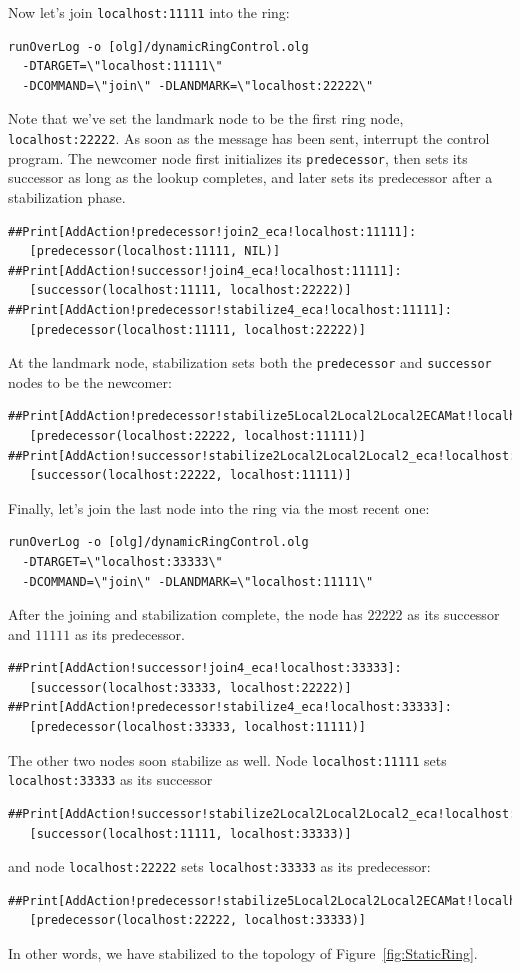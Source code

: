 \documentclass{article}
\begin{document}
Now let's join \lstinline$localhost:11111$ into the ring:
\begin{verbatim}
runOverLog -o [olg]/dynamicRingControl.olg
  -DTARGET=\"localhost:11111\"
  -DCOMMAND=\"join\" -DLANDMARK=\"localhost:22222\"
\end{verbatim}
Note that we've set the landmark node to be the first ring node,
\lstinline$localhost:22222$. As soon as the message has been sent,
interrupt the control program. The newcomer node first initializes its
\lstinline$predecessor$, then sets its successor as long as the lookup
completes, and later sets its predecessor after a stabilization phase.
\begin{verbatim}
##Print[AddAction!predecessor!join2_eca!localhost:11111]:
   [predecessor(localhost:11111, NIL)]
##Print[AddAction!successor!join4_eca!localhost:11111]:
   [successor(localhost:11111, localhost:22222)]
##Print[AddAction!predecessor!stabilize4_eca!localhost:11111]:
   [predecessor(localhost:11111, localhost:22222)]
\end{verbatim}
At the landmark node, stabilization sets both the
\lstinline$predecessor$ and \lstinline$successor$ nodes to be the
newcomer:
\begin{verbatim}
##Print[AddAction!predecessor!stabilize5Local2Local2Local2ECAMat!localhost:22222]:
   [predecessor(localhost:22222, localhost:11111)]
##Print[AddAction!successor!stabilize2Local2Local2Local2_eca!localhost:22222]:
   [successor(localhost:22222, localhost:11111)]
\end{verbatim}
Finally, let's join the last node into the ring via the most recent one:
\begin{verbatim}
runOverLog -o [olg]/dynamicRingControl.olg
  -DTARGET=\"localhost:33333\"
  -DCOMMAND=\"join\" -DLANDMARK=\"localhost:11111\"
\end{verbatim}
After the joining and stabilization complete, the node has $22222$ as
its successor and $11111$ as its predecessor.
\begin{verbatim}
##Print[AddAction!successor!join4_eca!localhost:33333]:
   [successor(localhost:33333, localhost:22222)]
##Print[AddAction!predecessor!stabilize4_eca!localhost:33333]:
   [predecessor(localhost:33333, localhost:11111)]
\end{verbatim}
The other two nodes soon stabilize as well. Node
\lstinline$localhost:11111$ sets \lstinline$localhost:33333$ as its
successor
\begin{verbatim}
##Print[AddAction!successor!stabilize2Local2Local2Local2_eca!localhost:11111]:
   [successor(localhost:11111, localhost:33333)]
\end{verbatim}
and node \lstinline$localhost:22222$ sets \lstinline$localhost:33333$ as
its predecessor:
\begin{verbatim}
##Print[AddAction!predecessor!stabilize5Local2Local2Local2ECAMat!localhost:22222]:
   [predecessor(localhost:22222, localhost:33333)]
\end{verbatim}
In other words, we have stabilized to the topology of
Figure~\ref{fig:StaticRing}.
\end{document}
